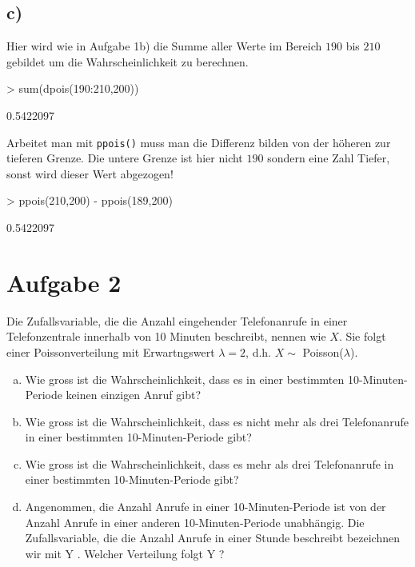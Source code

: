\subsection*{c)}
Hier wird wie in Aufgabe 1b) die Summe aller Werte im Bereich $190$ bis $210$
gebildet um die Wahrscheinlichkeit zu berechnen.
\begin{Schunk}
\begin{Sinput}
> sum(dpois(190:210,200))
\end{Sinput}
\begin{Soutput}
[1] 0.5422097
\end{Soutput}
\end{Schunk}
Arbeitet man mit \verb!ppois()! muss man die Differenz bilden von der 
höheren zur tieferen Grenze. Die untere Grenze ist hier nicht $190$ sondern
eine Zahl Tiefer, sonst wird dieser Wert abgezogen!
\begin{Schunk}
\begin{Sinput}
> ppois(210,200) - ppois(189,200)
\end{Sinput}
\begin{Soutput}
[1] 0.5422097
\end{Soutput}
\end{Schunk}

\section{Aufgabe 2}
Die Zufallsvariable, die die Anzahl eingehender Telefonanrufe in einer 
Telefonzentrale innerhalb von 10 Minuten beschreibt, nennen wie $X$.
Sie folgt einer Poissonverteilung mit Erwartngswert $\lambda = 2$, d.h.
$X \sim$ Poisson($\lambda$).

\begin{enumerate}[(a)]
    \item Wie gross ist die Wahrscheinlichkeit, dass es in einer 
          bestimmten 10-Minuten-Periode keinen einzigen Anruf gibt?
    \item Wie gross ist die Wahrscheinlichkeit, dass es nicht mehr als drei 
          Telefonanrufe in einer bestimmten 10-Minuten-Periode gibt?
    \item Wie gross ist die Wahrscheinlichkeit, dass es mehr als drei 
          Telefonanrufe in einer bestimmten 10-Minuten-Periode gibt?
    \item Angenommen, die Anzahl Anrufe in einer 10-Minuten-Periode ist von 
          der Anzahl Anrufe in einer anderen 10-Minuten-Periode unabhängig. 
          Die Zufallsvariable, die die Anzahl Anrufe in einer Stunde 
          beschreibt bezeichnen wir mit Y . Welcher Verteilung folgt Y ?
\end{enumerate}


